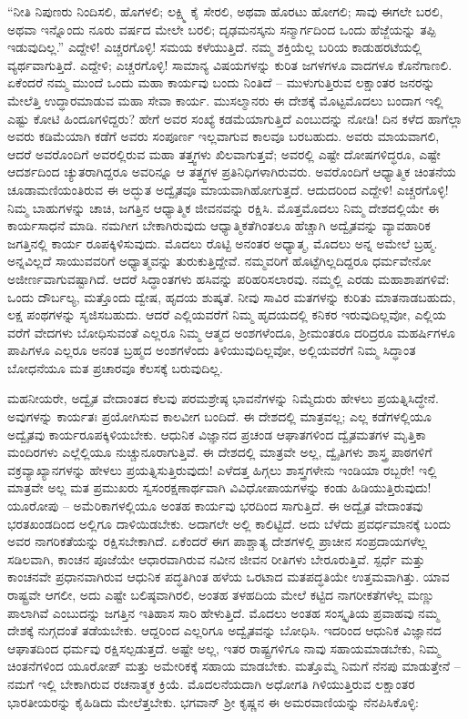 “ನೀತಿ ನಿಪುಣರು ನಿಂದಿಸಲಿ, ಹೊಗಳಲಿ; ಲಕ್ಷ್ಮಿ ಕೈ ಸೇರಲಿ, ಅಥವಾ ಹೊರಟು ಹೋಗಲಿ; ಸಾವು ಈಗಲೇ ಬರಲಿ, ಅಥವಾ ಇನ್ನೊಂದು ನೂರು ವರ್ಷದ ಮೇಲೇ ಬರಲಿ; ದೃಢಮನಸ್ಕನು ಸನ್ಮಾರ್ಗದಿಂದ ಒಂದು ಹೆಜ್ಜೆಯನ್ನು ತಪ್ಪಿ ಇಡುವುದಿಲ್ಲ.” ಎದ್ದೇಳಿ! ಎಚ್ಚರಗೊಳ್ಳಿ! ಸಮಯ ಕಳೆಯುತ್ತಿದೆ. ನಮ್ಮ ಶಕ್ತಿಯೆಲ್ಲ ಬರಿಯ ಕಾಡುಹರಟೆಯಲ್ಲಿ ವ್ಯರ್ಥವಾಗುತ್ತಿದೆ. ಎದ್ದೇಳಿ; ಎಚ್ಚರಗೊಳ್ಳಿ! ಸಾಮಾನ್ಯ ವಿಷಯಗಳನ್ನು ಕುರಿತ ಜಗಳಗಳೂ ವಾದಗಳೂ ಕೊನೆಗಾಣಲಿ. ಏಕೆಂದರೆ ನಮ್ಮ ಮುಂದೆ ಒಂದು ಮಹಾ ಕಾರ್ಯವು ಬಂದು ನಿಂತಿದೆ – ಮುಳುಗುತ್ತಿರುವ ಲಕ್ಷಾಂತರ ಜನರನ್ನು ಮೇಲೆತ್ತಿ ಉದ್ಧಾರಮಾಡುವ ಮಹಾ ಸೇವಾ ಕಾರ್ಯ. ಮುಸಲ್ಮಾನರು ಈ ದೇಶಕ್ಕೆ ಮೊಟ್ಟಮೊದಲು ಬಂದಾಗ ಇಲ್ಲಿ ಎಷ್ಟು ಕೋಟಿ ಹಿಂದೂಗಳಿದ್ದರು? ಹೇಗೆ ಅವರ ಸಂಖ್ಯೆ ಕಡಮೆಯಾಗುತ್ತಿದೆ ಎಂಬುದನ್ನು ನೋಡಿ! ದಿನ ಕಳೆದ ಹಾಗೆಲ್ಲಾ ಅವರು ಕಡಿಮೆಯಾಗಿ ಕಡೆಗೆ ಅವರು ಸಂಪೂರ್ಣ ಇಲ್ಲವಾಗುವ ಕಾಲವೂ ಬರಬಹುದು. ಅವರು ಮಾಯವಾಗಲಿ, ಆದರೆ ಅವರೊಂದಿಗೆ ಅವರಲ್ಲಿರುವ ಮಹಾ ತತ್ತ್ವಗಳು ಖಿಲವಾಗುತ್ತವೆ; ಅವರಲ್ಲಿ ಎಷ್ಟೇ ದೋಷಗಳಿದ್ಧರೂ, ಎಷ್ಟೇ ಆದರ್ಶದಿಂದ ಚ್ಯುತರಾಗಿದ್ದರೂ ಅವರಿನ್ನೂ ಆ ತತ್ತ್ವಗಳ ಪ್ರತಿನಿಧಿಗಳಾಗಿರುವರು. ಅವರೊಂದಿಗೆ ಆಧ್ಯಾತ್ಮಿಕ ಚಿಂತನೆಯ ಚೂಡಾಮಣಿಯಂತಿರುವ ಈ ಅದ್ಭುತ ಅದ್ವೈತವೂ ಮಾಯವಾಗಿಹೋಗುತ್ತದೆ. ಆದುದರಿಂದ ಎದ್ದೇಳಿ! ಎಚ್ಚರಗೊಳ್ಳಿ! ನಿಮ್ಮ ಬಾಹುಗಳನ್ನು ಚಾಚಿ, ಜಗತ್ತಿನ ಆಧ್ಯಾತ್ಮಿಕ ಜೀವನವನ್ನು ರಕ್ಷಿಸಿ. ಮೊತ್ತಮೊದಲು ನಿಮ್ಮ ದೇಶದಲ್ಲಿಯೇ ಈ ಕಾರ್ಯಸಾಧನೆ ಮಾಡಿ. ನಮಗೀಗ ಬೇಕಾಗಿರುವುದು ಆಧ್ಯಾತ್ಮಿಕತೆಗಿಂತಲೂ ಹೆಚ್ಚಾಗಿ ಅದ್ವೈತವನ್ನು ವ್ಯಾವಹಾರಿಕ ಜಗತ್ತಿನಲ್ಲಿ ಕಾರ್ಯ ರೂಪಕ್ಕಿಳಿಸುವುದು. ಮೊದಲು ರೊಟ್ಟಿ ಅನಂತರ ಅಧ್ಯಾತ್ಮ, ಮೊದಲು ಅನ್ನ ಅಮೇಲೆ ಬ್ರಹ್ಮ. ಅನ್ನವಿಲ್ಲದೆ ಸಾಯುವವರಿಗೆ ಅಧ್ಯಾತ್ಮವನ್ನು ತುರುಕುತ್ತಿದ್ದೇವೆ. ನಮ್ಮವರಿಗೆ ಹೊಟ್ಟೆಗಿಲ್ಲದಿದ್ದರೂ ಧರ್ಮವೇನೋ ಅಜೀರ್ಣವಾಗುವಷ್ಟಾಗಿದೆ. ಆದರೆ ಸಿದ್ಧಾಂತಗಳು ಹಸಿವನ್ನು ಪರಿಹರಿಸಲಾರವು. ನಮ್ಮಲ್ಲಿ ಎರಡು ಮಹಾಶಾಪಗಳಿವೆ: ಒಂದು ದೌರ್ಬಲ್ಯ, ಮತ್ತೊಂದು ದ್ವೇಷ, ಹೃದಯ ಶುಷ್ಕತೆ. ನೀವು ಸಾವಿರ ಮತಗಳನ್ನು ಕುರಿತು ಮಾತನಾಡಬಹುದು, ಲಕ್ಷ ಪಂಥಗಳನ್ನು ಸೃಜಿಸಬಹುದು. ಆದರೆ ಎಲ್ಲಿಯವರೆಗೆ ನಿಮ್ಮ ಹೃದಯದಲ್ಲಿ ಕನಿಕರ ಇರುವುದಿಲ್ಲವೋ, ಎಲ್ಲಿಯ ವರೆಗೆ ವೇದಗಳು ಬೋಧಿಸುವಂತೆ ಎಲ್ಲರೂ ನಿಮ್ಮ ಆತ್ಮದ ಅಂಶಗಳೆಂದೂ, ಶ‍್ರೀಮಂತರೂ ದರಿದ್ರರೂ ಮಹರ್ಷಿಗಳೂ ಪಾಪಿಗಳೂ ಎಲ್ಲರೂ ಅನಂತ ಬ್ರಹ್ಮದ ಅಂಶಗಳೆಂದು ತಿಳಿಯುವುದಿಲ್ಲವೋ, ಅಲ್ಲಿಯವರೆಗೆ ನಿಮ್ಮ ಸಿದ್ಧಾಂತ ಬೋಧನೆಯೂ ಮತ ಪ್ರಚಾರವೂ ಕೆಲಸಕ್ಕೆ ಬರುವುದಿಲ್ಲ. 

ಮಹನೀಯರೇ, ಅದ್ವೈತ ವೇದಾಂತದ ಕೆಲವು ಪರಮಶ್ರೇಷ್ಠ ಭಾವನೆಗಳನ್ನು ನಿಮ್ಮೆದುರು ಹೇಳಲು ಪ್ರಯತ್ನಿಸಿದ್ಧೇನೆ. ಅವುಗಳನ್ನು ಕಾರ್ಯತಃ ಪ್ರಯೋಗಿಸುವ ಕಾಲವೀಗ ಬಂದಿದೆ. ಈ ದೇಶದಲ್ಲಿ ಮಾತ್ರವಲ್ಲ; ಎಲ್ಲ ಕಡೆಗಳಲ್ಲಿಯೂ ಅದ್ವೈತವು ಕಾರ್ಯರೂಪಕ್ಕಿಳಿಯಬೇಕು. ಆಧುನಿಕ ವಿಜ್ಞಾನದ ಪ್ರಚಂಡ ಆಘಾತಗಳಿಂದ ದ್ವೈತಮತಗಳ ಮೃತ್ತಿಕಾ ಮಂದಿರಗಳು ಎಲ್ಲೆಲ್ಲಿಯೂ ನುಚ್ಚುನೂರಾಗುತ್ತಿವೆ. ಈ ದೇಶದಲ್ಲಿ ಮಾತ್ರವೇ ಅಲ್ಲ, ದ್ವೈತಿಗಳು ಶಾಸ್ತ್ರ ಪಾಠಗಳಿಗೆ ವಕ್ರವ್ಯಾಖ್ಯಾನಗಳನ್ನು ಹೇಳಲು ಪ್ರಯತ್ನಿಸುತ್ತಿರುವುದು! ಎಳೆದತ್ತ ಹಿಗ್ಗಲು ಶಾಸ್ತ್ರಗಳೇನು ಇಂಡಿಯಾ ರಬ್ಬರೇ! ಇಲ್ಲಿ ಮಾತ್ರವೇ ಅಲ್ಲ ಮತ ಪ್ರಮುಖರು ಸ್ವಸಂರಕ್ಷಣಾರ್ಥವಾಗಿ ವಿವಿಧೋಪಾಯಗಳನ್ನು ಕಂಡು ಹಿಡಿಯುತ್ತಿರುವುದು! ಯೂರೋಪು – ಅಮೆರಿಕಾಗಳಲ್ಲಿಯೂ ಅಂತಹ ಕಾರ್ಯವು ಭರದಿಂದ ಸಾಗುತ್ತಿದೆ. ಈ ಅದ್ವೈತ ವೇದಾಂತವು ಭರತಖಂಡದಿಂದ ಅಲ್ಲಿಗೂ ದಾಳಿಯಿಡಬೇಕು. ಅದಾಗಲೇ ಅಲ್ಲಿ ಕಾಲಿಟ್ಟಿದೆ. ಅದು ಬೆಳೆದು ಪ್ರವರ್ಧಮಾನಕ್ಕೆ ಬಂದು ಅವರ ನಾಗರಿಕತೆಯನ್ನು ರಕ್ಷಿಸಬೇಕಾಗಿದೆ. ಏಕೆಂದರೆ ಈಗ ಪಾಶ್ಚಾತ್ಯ ದೇಶಗಳಲ್ಲಿ ಪ್ರಾಚೀನ ಸಂಪ್ರದಾಯಗಳೆಲ್ಲ ಸಡಿಲವಾಗಿ, ಕಾಂಚನ ಪೂಜೆಯೇ ಆಧಾರವಾಗಿರುವ ನವೀನ ಜೀವನ ರೀತಿಗಳು ಬೇರೂರುತ್ತಿವೆ. ಸ್ಪರ್ಧೆ ಮತ್ತು ಕಾಂಚನವೇ ಪ್ರಧಾನವಾಗಿರುವ ಆಧುನಿಕ ಪದ್ಧತಿಗಿಂತ ಹಳೆಯ ಒರಟಾದ ಮತಪದ್ಧತಿಯೇ ಉತ್ತಮವಾಗಿತ್ತು. ಯಾವ ರಾಷ್ಟ್ರವೇ ಆಗಲೀ, ಅದು ಎಷ್ಟೇ ಬಲಿಷ್ಠವಾಗಿರಲಿ, ಅಂತಹ ತಳಹದಿಯ ಮೇಲೆ ಕಟ್ಟಿದ ನಾಗರೀಕತೆಗಳೆಲ್ಲ ಮಣ್ಣು ಪಾಲಾಗಿವೆ ಎಂಬುದನ್ನು ಜಗತ್ತಿನ ಇತಿಹಾಸ ಸಾರಿ ಹೇಳುತ್ತಿದೆ. ಮೊದಲು ಅಂತಹ ಸಂಸ್ಕೃತಿಯ ಪ್ರವಾಹವು ನಮ್ಮ ದೇಶಕ್ಕೆ ನುಗ್ಗದಂತೆ ತಡೆಯಬೇಕು. ಆದ್ದರಿಂದ ಎಲ್ಲರಿಗೂ ಅದ್ವೈತವನ್ನು ಬೋಧಿಸಿ. ಇದರಿಂದ ಆಧುನಿಕ ವಿಜ್ಞಾನದ ಆಘಾತದಿಂದ ಧರ್ಮವು ರಕ್ಷಿಸಲ್ಪಡುತ್ತದೆ. ಅಷ್ಟೇ ಅಲ್ಲ, ಇತರ ರಾಷ್ಟ್ರಗಳಿಗೂ ನಾವು ಸಹಾಯಮಾಡಬೇಕು, ನಿಮ್ಮ ಚಿಂತನೆಗಳಿಂದ ಯೂರೋಪ್​ ಮತ್ತು ಅಮೇರಿಕಕ್ಕೆ ಸಹಾಯ ಮಾಡಬೇಕು. ಮತ್ತೊಮ್ಮೆ ನಿಮಗೆ ನೆನಪು ಮಾಡುತ್ತೇನೆ – ನಮಗೆ ಇಲ್ಲಿ ಬೇಕಾಗಿರುವ ರಚನಾತ್ಮಕ ಕ್ರಿಯೆ. ಮೊದಲನೆಯದಾಗಿ ಅಧೋಗತಿ ಗಿಳಿಯುತ್ತಿರುವ ಲಕ್ಷಾಂತರ ಭಾರತೀಯರನ್ನು ಕೈಹಿಡಿದು ಮೇಲೆತ್ತಬೇಕು. ಭಗವಾನ್​ ಶ‍್ರೀ ಕೃಷ್ಣನ ಈ ಅಮರವಾಣಿಯನ್ನು ನೆನಪಿಸಿಕೊಳ್ಳಿ:

